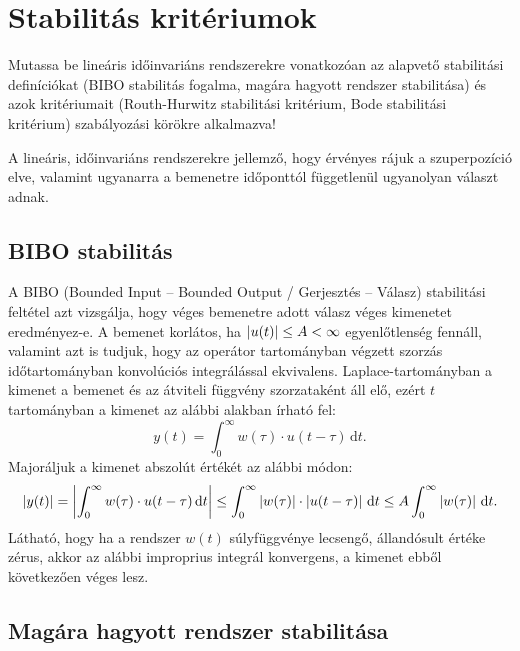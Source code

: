 \section{Stabilitás kritériumok}

\begin{about}
  Mutassa be lineáris időinvariáns rendszerekre vonatkozóan az alapvető
  stabilitási definíciókat (BIBO stabilitás fogalma, magára hagyott rendszer
  stabilitása) és azok kritériumait (Routh-Hurwitz stabilitási kritérium, Bode
  stabilitási kritérium) szabályozási körökre alkalmazva!
\end{about}

A lineáris, időinvariáns rendszerekre jellemző, hogy érvényes rájuk a
szuperpozíció elve, valamint ugyanarra a bemenetre időponttól függetlenül
ugyanolyan választ adnak.

\subsection{BIBO stabilitás}

A BIBO (Bounded Input -- Bounded Output / Gerjesztés -- Válasz) stabilitási
feltétel azt vizsgálja, hogy véges bemenetre adott válasz véges kimenetet
eredményez-e. A bemenet korlátos, ha $\left|u(t)\right| \leq A < \infty$
egyenlőtlenség fennáll, valamint azt is tudjuk, hogy az operátor tartományban
végzett szorzás időtartományban konvolúciós integrálással ekvivalens.
Laplace-tartományban a kimenet a bemenet és az átviteli függvény szorzataként
áll elő, ezért $t$ tartományban a kimenet az alábbi alakban írható fel:
\begin{equation}
  y(t)
  = \int_0^\infty w(\tau) \cdot u(t - \tau) \, \mathrm d t.
  \label{eq:BIBO-conv}
\end{equation}
Majoráljuk a kimenet abszolút értékét az alábbi módon:
\begin{equation}
  \left|y(t)\right|
  = \left|\int_0^\infty w(\tau) \cdot u(t - \tau) \, \mathrm d t\right|
  \leq \int_0^\infty \left|w(\tau)\right| \cdot \left|u(t - \tau)\right| \, \mathrm d t
  \leq A \int_0^\infty \left|w(\tau)\right| \, \mathrm d t.
  \label{eq:BIBO-major}
\end{equation}
Látható, hogy ha a rendszer $w(t)$ súlyfüggvénye lecsengő, állandósult értéke
zérus, akkor az alábbi improprius integrál konvergens, a kimenet ebből
következően véges lesz.

\subsection{Magára hagyott rendszer stabilitása}

